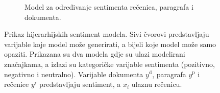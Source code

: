 \begin{figure}
\begin{subfigure}[b]{1\textwidth}
\begin{tikzpicture}[scale=0.75,every node/.style={transform shape}]
\end{tikzpicture}
\caption{Model za određivanje sentimenta rečenica, paragrafa i dokumenta.}
\label{fig:sentimentmodels:docparsent}
\end{subfigure}

\caption[Prikaz hijerarhijskih sentiment modela.]{Prikaz hijerarhijskih
sentiment modela. Sivi čvorovi predstavljaju varijable koje model može
generirati, a bijeli koje model može samo opaziti. Prikazana su dva modela gdje
su ulazi modelirani značajkama, a izlazi su kategoričke varijable sentimenta
(pozitivno, negativno i neutralno). Varijable dokumenta $y^{\text{d}}$,
paragrafa $y^{\text{p}}$ i rečenice $y^{\text{r}}$ predstavljaju sentiment, a
$x_i$ ulaznu rečenicu.}
\label{fig:sentimentmodels}
\end{figure}
